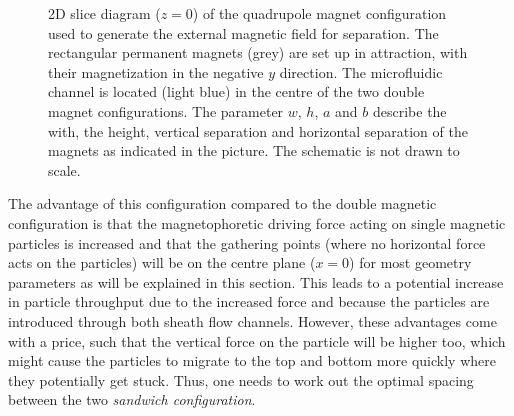 \begin{figure}[!htb]%
\centering
{}
\caption[2D diagram of the quadrupole magnet configuration]{2D slice diagram ($z=0$) of the quadrupole magnet configuration used to generate the external magnetic field for separation. The rectangular permanent magnets (grey) are set up in attraction, with their magnetization in the negative $y$ direction. The microfluidic channel is located (light blue) in the centre of the two double magnet configurations. The parameter $w$, $h$, $a$ and $b$ describe the with, the height, vertical separation and horizontal separation of the magnets as indicated in the picture. The schematic is not drawn to scale.}%
\label{fig:quadrupoleMagnetConfiguration}
\end{figure}

The advantage of this configuration compared to the double magnetic configuration is that the magnetophoretic driving force acting on single magnetic particles is increased and that the gathering points (where no horizontal force acts on the particles) will be on the centre plane ($x=0$) for most geometry parameters as will be explained in this section. This leads to a potential increase in particle throughput due to the increased force and because the particles are introduced through both sheath flow channels. However, these advantages come with a price, such that the vertical force on the particle will be higher too, which might cause the particles to migrate to the top and bottom more quickly where they potentially get stuck. Thus, one needs to work out the optimal spacing between the two \textit{sandwich configuration}. 

